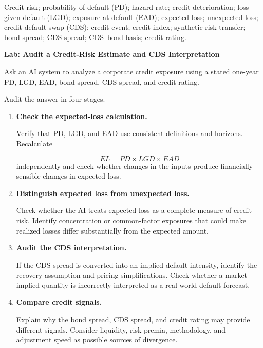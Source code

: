 
Credit risk; probability of default (PD); hazard rate; credit deterioration; loss given default (LGD); exposure at default (EAD); expected loss; unexpected loss; credit default swap (CDS); credit event; credit index; synthetic risk transfer; bond spread; CDS spread; CDS--bond basis; credit rating.




\textbf{Lab: Audit a Credit-Risk Estimate and CDS Interpretation}

Ask an AI system to analyze a corporate credit exposure using a stated one-year PD, LGD, EAD, bond spread, CDS spread, and credit rating.

Audit the answer in four stages.

\begin{enumerate}

\item \textbf{Check the expected-loss calculation.}

Verify that PD, LGD, and EAD use consistent definitions and horizons. Recalculate

$$
EL=PD\times LGD\times EAD
$$
independently and check whether changes in the inputs produce financially sensible changes in expected loss.

\item \textbf{Distinguish expected loss from unexpected loss.}

Check whether the AI treats expected loss as a complete measure of credit risk. Identify concentration or common-factor exposures that could make realized losses differ substantially from the expected amount.

\item \textbf{Audit the CDS interpretation.}

If the CDS spread is converted into an implied default intensity, identify the recovery assumption and pricing simplifications. Check whether a market-implied quantity is incorrectly interpreted as a real-world default forecast.

\item \textbf{Compare credit signals.}

Explain why the bond spread, CDS spread, and credit rating may provide different signals. Consider liquidity, risk premia, methodology, and adjustment speed as possible sources of divergence.

\end{enumerate}


